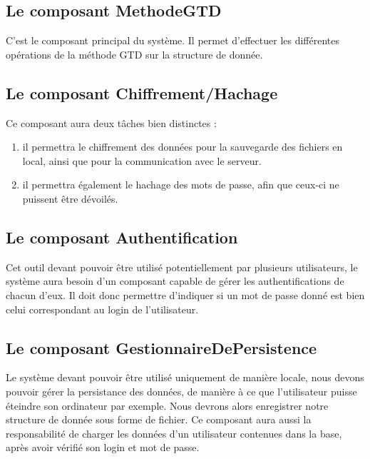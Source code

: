\subsection{Le composant MethodeGTD}

C'est le composant principal du système.
Il permet d'effectuer les différentes opérations de la méthode GTD sur la structure de donnée.

\subsection{Le composant Chiffrement/Hachage}

Ce composant aura deux tâches bien distinctes : 

\begin{enumerate}
\item il permettra le chiffrement des données pour la sauvegarde des fichiers en local, ainsi que pour la communication avec le serveur.
\item il permettra également le hachage des mots de passe, afin que ceux-ci ne puissent être dévoilés.
\end{enumerate}


\subsection{Le composant Authentification}

Cet outil devant pouvoir être utilisé potentiellement par plusieurs utilisateurs, le système aura besoin d'un composant capable de gérer les authentifications de chacun d'eux.
Il doit donc permettre d'indiquer si un mot de passe donné est bien celui correspondant au login de l'utilisateur.

\subsection{Le composant GestionnaireDePersistence}

Le système devant pouvoir être utilisé uniquement de manière locale, nous devons pouvoir gérer la persistance des données, de manière à ce que l'utilisateur puisse éteindre son ordinateur par exemple.
Nous devrons alors enregistrer notre structure de donnée sous forme de fichier.
Ce composant aura aussi la responsabilité de charger les données d'un utilisateur contenues dans la base, après avoir vérifié son login et mot de passe.

